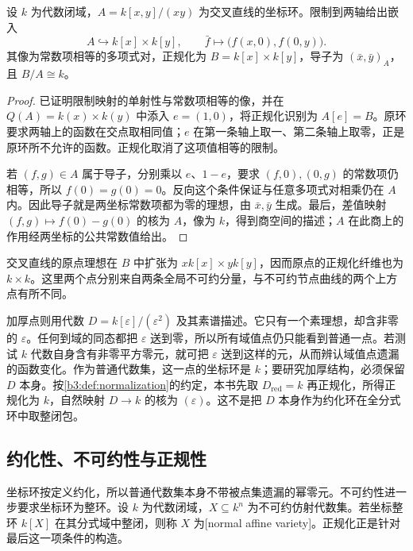 \begin{proposition}\label{b3:prop:crossed-lines-normalization}
	设 \(k\) 为代数闭域，\(A=k[x,y]/(xy)\) 为交叉直线的坐标环。限制到两轴给出嵌入
	\[
		A\hookrightarrow k[x]\times k[y],\qquad \bar f\longmapsto\bigl(f(x,0),f(0,y)\bigr).
	\]
	其像为常数项相等的多项式对，正规化为 \(B=k[x]\times k[y]\)，导子为 \((\bar x,\bar y)_A\)，且 \(B/A\cong k\)。
\end{proposition}
\begin{proof}
	已证明限制映射的单射性与常数项相等的像，并在 \(Q(A)=k(x)\times k(y)\) 中添入 \(e=(1,0)\)，将正规化识别为 \(A[e]=B\)。原环要求两轴上的函数在交点取相同值；\(e\) 在第一条轴上取一、第二条轴上取零，正是原环所不允许的函数。正规化取消了这项值相等的限制。

	若 \((f,g)\in A\) 属于导子，分别乘以 \(e\)、\(1-e\)，要求 \((f,0),(0,g)\) 的常数项仍相等，所以 \(f(0)=g(0)=0\)。反向这个条件保证与任意多项式对相乘仍在 \(A\) 内。因此导子就是两坐标常数项都为零的理想，由 \(\bar x,\bar y\) 生成。最后，差值映射 \((f,g)\mapsto f(0)-g(0)\) 的核为 \(A\)，像为 \(k\)，得到商空间的描述；\(A\) 在此商上的作用经两坐标的公共常数值给出。
\end{proof}

交叉直线的原点理想在 \(B\) 中扩张为 \(xk[x]\times yk[y]\)，因而原点的正规化纤维也为 \(k\times k\)。这里两个点分别来自两条全局不可约分量，与不可约节点曲线的两个上方点有所不同。

加厚点则用代数 \(D=k[\varepsilon]/(\varepsilon^2)\) 及其素谱描述。它只有一个素理想，却含非零的 \(\varepsilon\)。任何到域的同态都把 \(\varepsilon\) 送到零，所以所有域值点仍只能看到普通一点。若测试 \(k\) 代数自身含有非零平方零元，就可把 \(\varepsilon\) 送到这样的元，从而辨认域值点遗漏的函数变化。作为普通代数集，这一点的坐标环是 \(k\)；要研究加厚结构，必须保留 \(D\) 本身。按\cref{b3:def:normalization}的约定，本书先取 \(D_{\mathrm{red}}=k\) 再正规化，所得正规化为 \(k\)，自然映射 \(D\to k\) 的核为 \((\varepsilon)\)。这不是把 \(D\) 本身作为约化环在全分式环中取整闭包。

\subsection{约化性、不可约性与正规性}
\label{b3:subsec:0704:02}

坐标环按定义约化，所以普通代数集本身不带被点集遗漏的幂零元。不可约性进一步要求坐标环为整环。设 \(k\) 为代数闭域，\(X\subseteq k^n\) 为不可约仿射代数集。若坐标整环 \(k[X]\) 在其分式域中整闭，则称 \(X\) 为[normal affine variety]。正规化正是针对最后这一项条件的构造。

